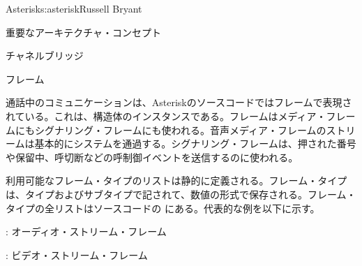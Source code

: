 \begin{aosachapter}{Asterisk}{s:asterisk}{Russell Bryant}
\begin{aosasect1}{重要なアーキテクチャ・コンセプト}
\begin{aosasect2}{チャネルブリッジ}

\end{aosasect2}

\begin{aosasect2}{フレーム}

通話中のコミュニケーションは、Asteriskのソースコードではフレームで表現されている。これは、構造体のインスタンスである。フレームはメディア・フレームにもシグナリング・フレームにも使われる。音声メディア・フレームのストリームは基本的にシステムを通過する。シグナリング・フレームは、押された番号や保留中、呼切断などの呼制御イベントを送信するのに使われる。

利用可能なフレーム・タイプのリストは静的に定義される。フレーム・タイプは、タイプおよびサブタイプで記されて、数値の形式で保存される。フレーム・タイプの全リストはソースコードの にある。代表的な例を以下に示す。

\begin{aosaitemize}

  \item {}: オーディオ・ストリーム・フレーム

  \item {}: ビデオ・ストリーム・フレーム


\end{aosaitemize}
\end{aosasect2}
\end{aosasect1}
\end{aosachapter}
